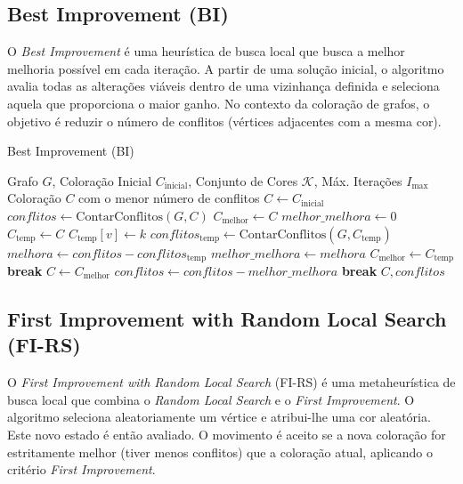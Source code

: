 \documentclass[12pt,a4paper]{article}
\begin{document}
\subsection{Best Improvement (BI)}
O \textit{Best Improvement} é uma heurística de busca local que busca a melhor melhoria possível em cada iteração. A partir de uma solução inicial, o algoritmo avalia todas as alterações viáveis dentro de uma vizinhança definida e seleciona aquela que proporciona o maior ganho. No contexto da coloração de grafos, o objetivo é reduzir o número de conflitos (vértices adjacentes com a mesma cor).

\begin{algorithm}
\caption{Best Improvement (BI)}
\label{alg:best_improvement}
\begin{algorithmic}[1]
\REQUIRE Grafo $G$, Coloração Inicial $C_{\text{inicial}}$, Conjunto de Cores $\mathcal{K}$, Máx. Iterações $I_{\max}$
\ENSURE Coloração $C$ com o menor número de conflitos
\STATE $C \gets C_{\text{inicial}}$
\STATE $conflitos \gets \text{ContarConflitos}(G, C)$
    \STATE $C_{\text{melhor}} \gets C$
    \STATE $melhor\_melhora \gets 0$
            \STATE $C_{\text{temp}} \gets C$
            \STATE $C_{\text{temp}}[v] \gets k$
            \STATE $conflitos_{\text{temp}} \gets \text{ContarConflitos}(G, C_{\text{temp}})$
            \STATE $melhora \gets conflitos - conflitos_{\text{temp}}$
                \STATE $melhor\_melhora \gets melhora$
                \STATE $C_{\text{melhor}} \gets C_{\text{temp}}$
            \ENDIF
        \ENDFOR
    \ENDFOR
        \STATE \textbf{break} 
    \ENDIF
    \STATE $C \gets C_{\text{melhor}}$
    \STATE $conflitos \gets conflitos - melhor\_melhora$
        \STATE \textbf{break}
    \ENDIF
\ENDFOR
\RETURN $C, conflitos$
\end{algorithmic}
\end{algorithm}

\subsection{First Improvement with Random Local Search (FI-RS)}
O \textit{First Improvement with Random Local Search} (FI-RS) é uma metaheurística de busca local que combina o \textit{Random Local Search} e o \textit{First Improvement}. O algoritmo seleciona aleatoriamente um vértice e atribui-lhe uma cor aleatória. Este novo estado é então avaliado. O movimento é aceito se a nova coloração for estritamente melhor (tiver menos conflitos) que a coloração atual, aplicando o critério \textit{First Improvement}.
\end{document}
